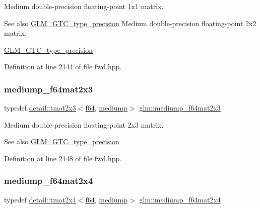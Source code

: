 Medium double-\/precision floating-\/point 1x1 matrix. \begin{DoxySeeAlso}{See also}
\hyperlink{group__gtc__type__precision}{G\+L\+M\+\_\+\+G\+T\+C\+\_\+type\+\_\+precision} Medium double-\/precision floating-\/point 2x2 matrix. 

\hyperlink{group__gtc__type__precision}{G\+L\+M\+\_\+\+G\+T\+C\+\_\+type\+\_\+precision} 
\end{DoxySeeAlso}


Definition at line 2144 of file fwd.\+hpp.

\mbox{\label{group__gtc__type__precision_ga6f463cb5e9b4e5c07a385843ed50e6b8}} 
\subsubsection{\texorpdfstring{mediump\+\_\+f64mat2x3}{mediump\_f64mat2x3}}
{\footnotesize\ttfamily typedef \hyperlink{structglm_1_1detail_1_1tmat2x3}{detail\+::tmat2x3}$<$\hyperlink{group__gtc__type__precision_ga2bba392e555124b36cde6abba349bab3}{f64}, \hyperlink{namespaceglm_a0f04f086094c747d227af4425893f545a6416f3ea0c9025fb21ed50c4d6620482}{mediump}$>$ \hyperlink{group__gtc__type__precision_ga6f463cb5e9b4e5c07a385843ed50e6b8}{glm\+::mediump\+\_\+f64mat2x3}}

Medium double-\/precision floating-\/point 2x3 matrix. \begin{DoxySeeAlso}{See also}
\hyperlink{group__gtc__type__precision}{G\+L\+M\+\_\+\+G\+T\+C\+\_\+type\+\_\+precision} 
\end{DoxySeeAlso}


Definition at line 2148 of file fwd.\+hpp.

\mbox{\label{group__gtc__type__precision_ga65c67789f7e2ff605d8f48dc3750a515}} 
\subsubsection{\texorpdfstring{mediump\+\_\+f64mat2x4}{mediump\_f64mat2x4}}
{\footnotesize\ttfamily typedef \hyperlink{structglm_1_1detail_1_1tmat2x4}{detail\+::tmat2x4}$<$\hyperlink{group__gtc__type__precision_ga2bba392e555124b36cde6abba349bab3}{f64}, \hyperlink{namespaceglm_a0f04f086094c747d227af4425893f545a6416f3ea0c9025fb21ed50c4d6620482}{mediump}$>$ \hyperlink{group__gtc__type__precision_ga65c67789f7e2ff605d8f48dc3750a515}{glm\+::mediump\+\_\+f64mat2x4}}

